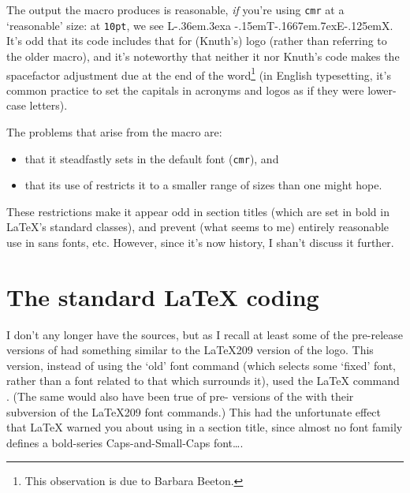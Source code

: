 \begin{Article}
  The output the macro produces is reasonable, \emph{if} you're using
  \texttt{cmr} at a `reasonable' size: at \texttt{10pt}, we see
  {\selectfont L\kern-.36em\raise.3ex\hbox{\sc a}%
    \kern-.15emT\kern-.1667em\lower.7ex\hbox{E}\kern-.125emX}\@.  It's
  odd that its code includes that for (Knuth's) logo  (rather
  than referring to the older macro), and it's noteworthy that neither
  it nor Knuth's code makes the spacefactor adjustment due at the end
  of the word\footnote{This observation is due to Barbara Beeton.} (in
  English typesetting, it's common practice to set the capitals in
  acronyms and logos as if they were lower-case letters).

  The problems that arise from the macro are:
  \begin{itemize}
  \setlength{\itemsep}{0pt}%
  \item that it steadfastly sets in the default font (\texttt{cmr}),
    and
  \item that its use of  restricts it to a smaller range of
    sizes than one might hope.
  \end{itemize}
  These restrictions make it appear odd in section titles (which are
  set in bold in \LaTeX's standard classes), and prevent (what seems
  to me) entirely reasonable use in sans fonts, etc.  However, since
  it's now history, I shan't discuss it further.

  \section{The standard \LaTeX{} coding}

  I don't any longer have the sources, but as I recall at least some
  of the pre-release versions of \LaTeXe{} had something similar to
  the \LaTeX209{} version of the logo.  This version, instead of using
  the `old' font command  (which selects some `fixed' font,
  rather than a font related to that which surrounds it), used the
  \LaTeX{} command .  (The same would also have been true
  of pre-\LaTeXe{} versions of the  with their subversion
  of the \LaTeX209{} font commands.)  This had the unfortunate effect
  that \LaTeX{} warned you about using  in a section title,
  since almost no font family defines a bold-series
  Caps-and-Small-Caps font\dots.


\end{Article}
